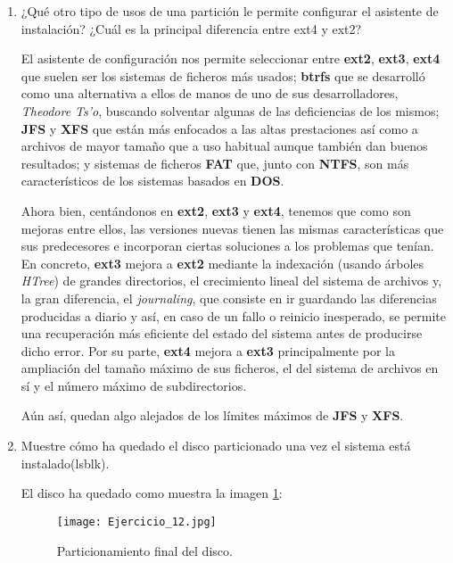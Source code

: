 \documentclass[paper=a4, fontsize=11pt]{scrartcl} %
\numberwithin{equation}{section} %
\numberwithin{figure}{section} %
\numberwithin{table}{section} %
\begin{document}
\begin{enumerate}
		\item ¿Qué otro tipo de usos de una partición le permite configurar el asistente de instalación?
		¿Cuál es la principal diferencia entre ext4 y ext2?
		
		El asistente de configuración nos permite seleccionar entre \textbf{ext2}\cite{ext2},
		\textbf{ext3}\cite{ext3}, \textbf{ext4}\cite{ext4} que suelen ser los sistemas de ficheros más
		usados; \textbf{btrfs}\cite{btrfs} que se desarrolló como una alternativa a ellos de manos de
		uno de sus desarrolladores, \textit{Theodore Ts'o}, buscando solventar algunas de las
		deficiencias de los mismos; \textbf{JFS}\cite{JFS} y \textbf{XFS}\cite{XFS} que están más
		enfocados a las altas prestaciones así como a archivos de mayor tamaño que a uso habitual
		aunque también dan buenos resultados; y sistemas de ficheros \textbf{FAT}\cite{FAT} que,
		junto con \textbf{NTFS}\cite{NTFS}, son más característicos de los sistemas basados en
		\textbf{DOS}.
		
		Ahora bien, centándonos en \textbf{ext2}, \textbf{ext3} y \textbf{ext4}, tenemos que como son
		mejoras entre ellos, las versiones nuevas tienen las mismas características que sus predecesores
		e incorporan ciertas soluciones a los problemas que tenían.
		\newline
		En concreto, \textbf{ext3} mejora a \textbf{ext2} mediante la indexación (usando árboles
		\textit{HTree}) de grandes directorios, el crecimiento lineal del sistema de archivos y, la
		gran diferencia, el \textit{journaling}\cite{journaling}, que consiste en ir guardando las
		diferencias producidas a diario y así, en caso de un fallo o reinicio inesperado, se permite
		una recuperación más eficiente del estado del sistema antes de producirse dicho error.
		\newline
		Por su parte, \textbf{ext4} mejora a \textbf{ext3} principalmente por la ampliación del tamaño
		máximo de sus ficheros, el del sistema de archivos en sí y el número máximo de subdirectorios.
		
		Aún así, quedan algo alejados de los límites máximos de \textbf{JFS} y \textbf{XFS}.
		
		\item Muestre cómo ha quedado el disco particionado una vez el sistema está instalado(lsblk).
		
		El disco ha quedado como muestra la imagen \ref{fig:disco}:
		
		\begin{figure}[H]
			\centering
			\texttt{[image: Ejercicio\_12.jpg]}
			\caption{Particionamiento final del disco.}
			\label{fig:disco}	
		\end{figure}
		

\end{enumerate}
\end{document}
